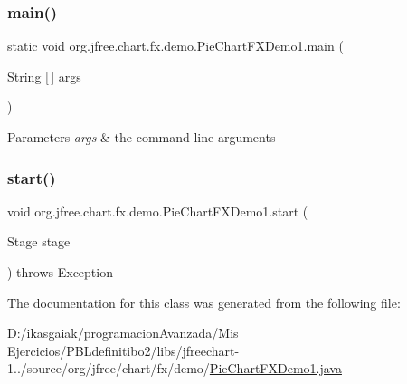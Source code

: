 \subsubsection{\texorpdfstring{main()}{main()}}
{\footnotesize\ttfamily static void org.\+jfree.\+chart.\+fx.\+demo.\+Pie\+Chart\+F\+X\+Demo1.\+main (\begin{DoxyParamCaption}\item[{String \mbox{[}$\,$\mbox{]}}]{args }\end{DoxyParamCaption})\hspace{0.3cm}{\ttfamily [static]}}


\begin{DoxyParams}{Parameters}
{\em args} & the command line arguments \\
\hline
\end{DoxyParams}
\mbox{\label{classorg_1_1jfree_1_1chart_1_1fx_1_1demo_1_1_pie_chart_f_x_demo1_aff578d100b17f68324c4c61654f0a9d5}} 
\subsubsection{\texorpdfstring{start()}{start()}}
{\footnotesize\ttfamily void org.\+jfree.\+chart.\+fx.\+demo.\+Pie\+Chart\+F\+X\+Demo1.\+start (\begin{DoxyParamCaption}\item[{Stage}]{stage }\end{DoxyParamCaption}) throws Exception}



The documentation for this class was generated from the following file\+:\begin{DoxyCompactItemize}
\item 
D\+:/ikasgaiak/programacion\+Avanzada/\+Mis Ejercicios/\+P\+B\+Ldefinitibo2/libs/jfreechart-\/1../source/org/jfree/chart/fx/demo/\mbox{\hyperlink{_pie_chart_f_x_demo1_8java}{Pie\+Chart\+F\+X\+Demo1.\+java}}\end{DoxyCompactItemize}
